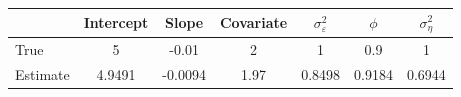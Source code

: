 \begin{tabular}{lcccccc}
\toprule
& Intercept & Slope & Covariate & $\sigma_\varepsilon^2$ & $\phi$ & $\sigma_\eta^2$ \\
\midrule
True & 5 & -0.01 & 2 & 1 & 0.9 & 1 \\
Estimate & 4.9491 & -0.0094 & 1.97 & 0.8498 & 0.9184 & 0.6944 \\
\bottomrule
\end{tabular}
